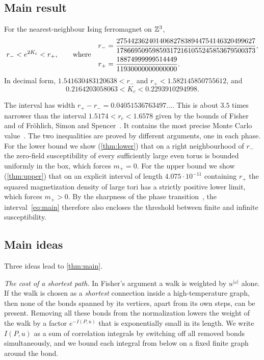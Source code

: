 \subsection{Main result}

\begin{theorem}\label{thm:main}
For the nearest-neighbour Ising ferromagnet on $\mathbb Z^3$,
\begin{equation}\label{eq:main}
 r_-<e^{2K_c}<r_+,\qquad\text{where}\quad
 \begin{aligned}
 r_-&=\frac{275442362401406827838944754146320499627}{178669509598593172161055245853679500373},\\[2pt]
 r_+&=\frac{18874999999514449}{11930000000000000} .
 \end{aligned}
\end{equation}
In decimal form, $1.541630483120638<r_-$ and $r_+<1.582145850755612$, and
\begin{equation}\label{eq:mainK}
 0.2164203058063<K_c<0.2293910294998 .
\end{equation}
\end{theorem}



The interval has width $r_+-r_-=0.04051536763497\ldots$. This is about $3.5$ times narrower than the interval $1.5174<r_c<1.6578$ given by the bounds of Fisher~\cite{Fis67} and of Fr\"ohlich, Simon and Spencer~\cite{FSS76}. It contains the most precise Monte Carlo value~\cite{FXL18}. The two inequalities are proved by different arguments, one in each phase. For the lower bound we show (\cref{thm:lower}) that on a right neighbourhood of $r_-$ the zero-field susceptibility of every sufficiently large even torus is bounded uniformly in the box, which forces $m_+=0$. For the upper bound we show (\cref{thm:upper}) that on an explicit interval of length $4.075\cdot10^{-11}$ containing $r_+$ the squared magnetization density of large tori has a strictly positive lower limit, which forces $m_+>0$. By the sharpness of the phase transition~\cite{ABF87,DCT16}, the interval~\eqref{eq:main} therefore also encloses the threshold between finite and infinite susceptibility.

\subsection{Main ideas}

Three ideas lead to \cref{thm:main}.

\emph{The cost of a shortest path.} In Fisher's argument a walk is weighted by $u^{|\omega|}$ alone. If the walk is chosen as a \emph{shortest} connection inside a high-temperature graph, then none of the bonds spanned by its vertices, apart from its own steps, can be present. Removing all these bonds from the normalization lowers the weight of the walk by a factor $e^{-I(P,u)}$ that is exponentially small in its length. We write $I(P,u)$ as a sum of correlation integrals by switching off all removed bonds simultaneously, and we bound each integral from below on a fixed finite graph around the bond.

